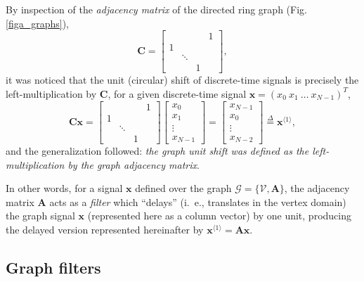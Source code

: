 By inspection of the \emph{adjacency matrix} of the directed ring graph (Fig. \ref{figa_graphs}),
\begin{equation}\label{eq:C}
\mathbf{C} =
\begin{bmatrix}
&  &  &   1\\ 
1 &  &   & \\ 
&   \ddots &  & \\ 
&  &   1 & 
\end{bmatrix},
\end{equation}
it was noticed that the unit (circular) shift of discrete-time signals is precisely the left-multiplication by $ \mathbf{C} $, for a given discrete-time signal $ \mathbf{x} = (x_0 \ x_1 \ \dots \ x_{N-1})^T $,
\begin{equation}\label{eq:unit_shift}
\mathbf{C}\mathbf{x} =
\begin{bmatrix}
&  &  &   1\\ 
1 &  &   & \\ 
&   \ddots &  & \\ 
&  &   1 & 
\end{bmatrix}
\begin{bmatrix}
x_0 \\ x_1 \\ \vdots \\ x_{N-1}
\end{bmatrix} =
\begin{bmatrix}
x_{N-1} \\ x_0 \\ \vdots \\ x_{N-2}
\end{bmatrix} \overset{\Delta}{=} \mathbf{x}^{\langle 1 \rangle},
\end{equation}
and the generalization followed: \emph{the graph unit shift was defined as the left-multiplication by the graph adjacency matrix}.

In other words, for a signal $ \mathbf{x} $ defined over the graph $ \mathcal{G} = \{\mathcal{V}, \mathbf{A}\} $, the adjacency matrix $ \mathbf{A} $ acts as a \emph{filter} which ``delays'' (i.~e., translates in the vertex domain) the graph signal $ \mathbf{x} $ (represented here as a column vector) by one unit, producing the delayed version represented hereinafter by $ \mathbf{x}^{\langle 1 \rangle} = \mathbf{A} \mathbf{x}$.

\subsection{Graph filters}
\label{subsec:filtros}

